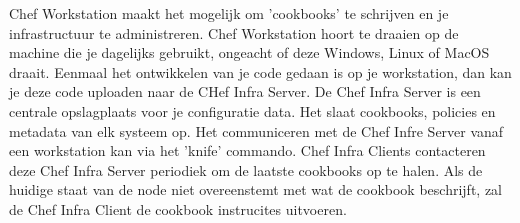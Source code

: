 Chef Workstation maakt het mogelijk om 'cookbooks' te schrijven en je infrastructuur te administreren. Chef Workstation hoort te draaien op de machine die je dagelijks gebruikt, ongeacht of deze Windows, Linux of MacOS draait.
Eenmaal het ontwikkelen van je code gedaan is op je workstation, dan kan je deze code uploaden naar de CHef Infra Server. De Chef Infra Server is een centrale opslagplaats voor je configuratie data. Het slaat cookbooks, policies en metadata van elk systeem op. Het communiceren met de Chef Infre Server vanaf een workstation kan via het 'knife' commando.
Chef Infra Clients contacteren deze Chef Infra Server periodiek om de laatste cookbooks op te halen. Als de huidige staat van de node niet overeenstemt met wat de cookbook beschrijft, zal de Chef Infra Client de cookbook instrucites uitvoeren. \autocite{Chef} \break




%



